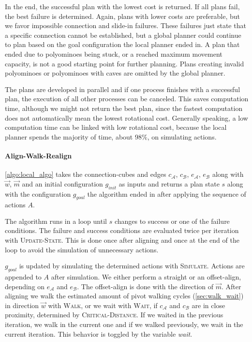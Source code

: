 In the end, the successful plan with the lowest cost is returned.
If all plans fail, the best failure is determined.
Again, plans with lower costs are preferable, but we favor impossible connection and slide-in failures.
These failures just state that a specific connection cannot be established, but a global planner could continue to plan based on the goal configuration the local planner ended in.
A plan that ended due to polyominoes being stuck, or a reached maximum movement capacity, is not a good starting point for further planning.
Plans creating invalid polyominoes or polyominoes with caves are omitted by the global planner.

The plans are developed in parallel and if one process finishes with a successful plan, the execution of all other processes can be canceled.
This saves computation time, although we might not return the best plan, since the fastest computation does not automatically mean the lowest rotational cost.
Generally speaking, a low computation time can be linked with low rotational cost, because the local planner spends the majority of time, about $98\%$, on simulating actions.

\newpage

\paragraph{Align-Walk-Realign}

\autoref{algo:local_algo} takes the connection-cubes and edges $c_\mathcal{A}$, $c_\mathcal{B}$, $e_\mathcal{A}$, $e_\mathcal{B}$ along with $\vec{w}$, $\vec{m}$ and an initial configuration $g_\textit{init}$ as inputs and returns a plan state $s$ along with the configuration $g_\textit{goal}$ the algorithm ended in after applying the sequence of actions $A$.

The algorithm runs in a loop until $s$ changes to success or one of the failure conditions.
The failure and success conditions are evaluated twice per iteration with {\scshape Update-State}.
This is done once after aligning and once at the end of the loop to avoid the simulation of unnecessary actions.

$g_\textit{goal}$ is updated by simulating the determined actions with {\scshape Simulate}.
Actions are appended to $A$ after simulation.
We either perform a straight or an offset-align, depending on $e_\mathcal{A}$ and $e_\mathcal{B}$.
The offset-align is done with the direction of $\vec{m}$.
After aligning we walk the estimated amount of pivot walking cycles (\autoref{sec:walk_wait}) in direction $\vec{w}$ with {\scshape Walk}, or we wait with {\scshape Wait}, if $c_\mathcal{A}$ and $c_\mathcal{B}$ are in close proximity, determined by {\scshape Critical-Distance}.
If we waited in the previous iteration, we walk in the current one and if we walked previously, we wait in the current iteration.
This behavior is toggled by the variable \textit{wait}.

